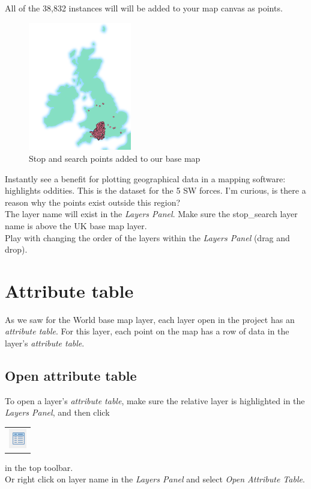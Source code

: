 All of the 38,832 instances will will be added to your map canvas as points.\\

\begin{figure}[!h]
	\centering
	\includegraphics[width=0.4\textwidth]{images/stop_search_38832_points_over_uk.png}
	\caption{Stop and search points added to our base map}
	\label{ft_fig_firstfig3}
\end{figure}

Instantly see a benefit for plotting geographical data in a mapping software: highlights oddities. This is the dataset for the 5 SW forces. I'm curious, is there a reason why the points exist outside this region?\\

The layer name will exist in the \textit{Layers Panel}. Make sure the stop\_search layer name is above the UK base map layer.\\
Play with changing the order of the layers within the \textit{Layers Panel} (drag and drop).\\

\section{Attribute table}

As we saw for the World base map layer, each layer open in the project has an \textit{attribute table}. For this layer, each point on the map has a row of data in the layer's \textit{attribute table}.

\subsection{Open attribute table}

To open a layer's \textit{attribute table}, make sure the relative layer is highlighted in the \textit{Layers Panel}, and then click	\begin{tabular}{@{}c@{}}\includegraphics[width=4ex]{images/attribute_table_icon.png}\end{tabular}
in the top toolbar.\\
Or right click on layer name in the \textit{Layers Panel} and select \textit{Open Attribute Table}.

